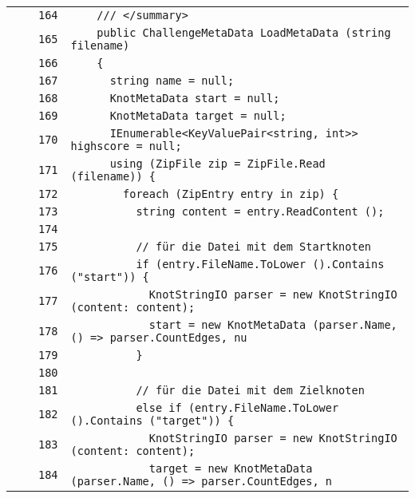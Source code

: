 \documentclass[a4paper,10pt]{article}
\begin{document}
\begin{longtable}[l]{lrrl}
\cellcolor{gray} &  & \verb~164~ & \verb~    /// </summary>~\\
\cellcolor{gray} &  & \verb~165~ & \verb~    public ChallengeMetaData LoadMetaData (string filename)~\\
\cellcolor{gray} &  & \verb~166~ & \verb~    {~\\
\cellcolor{gray} &  & \verb~167~ & \verb~      string name = null;~\\
\cellcolor{gray} &  & \verb~168~ & \verb~      KnotMetaData start = null;~\\
\cellcolor{gray} &  & \verb~169~ & \verb~      KnotMetaData target = null;~\\
\cellcolor{gray} &  & \verb~170~ & \verb~      IEnumerable<KeyValuePair<string, int>> highscore = null;~\\
\cellcolor{gray} &  & \verb~171~ & \verb~      using (ZipFile zip = ZipFile.Read (filename)) {~\\
\cellcolor{gray} &  & \verb~172~ & \verb~        foreach (ZipEntry entry in zip) {~\\
\cellcolor{gray} &  & \verb~173~ & \verb~          string content = entry.ReadContent ();~\\
\cellcolor{gray} &  & \verb~174~ & \verb~~\\
\cellcolor{gray} &  & \verb~175~ & \verb~          // für die Datei mit dem Startknoten~\\
\cellcolor{gray} &  & \verb~176~ & \verb~          if (entry.FileName.ToLower ().Contains ("start")) {~\\
\cellcolor{gray} &  & \verb~177~ & \verb~            KnotStringIO parser = new KnotStringIO (content: content);~\\
\cellcolor{gray} &  & \verb~178~ & \verb~            start = new KnotMetaData (parser.Name, () => parser.CountEdges, nu~\\
\cellcolor{gray} &  & \verb~179~ & \verb~          }~\\
\cellcolor{gray} &  & \verb~180~ & \verb~~\\
\cellcolor{gray} &  & \verb~181~ & \verb~          // für die Datei mit dem Zielknoten~\\
\cellcolor{gray} &  & \verb~182~ & \verb~          else if (entry.FileName.ToLower ().Contains ("target")) {~\\
\cellcolor{gray} &  & \verb~183~ & \verb~            KnotStringIO parser = new KnotStringIO (content: content);~\\
\cellcolor{gray} &  & \verb~184~ & \verb~            target = new KnotMetaData (parser.Name, () => parser.CountEdges, n~\\

\end{longtable}
\end{document}
